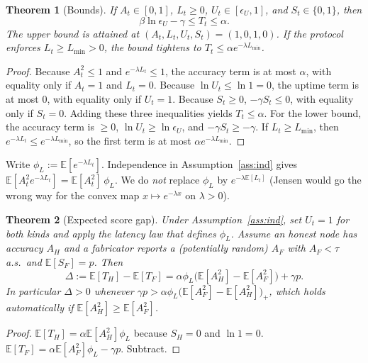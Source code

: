 \documentclass[conference]{IEEEtran}
\newtheorem{theorem}{Theorem}
\begin{document}
\begin{theorem}[Bounds]
\label{thm:bounds}
If $A_t\in[0,1]$, $L_t\ge 0$, $U_t\in[\epsilon_U,1]$, and $S_t\in\{0,1\}$, then
\[
  \beta\ln\epsilon_U-\gamma \le T_t \le \alpha.
\]
The upper bound is attained at $(A_t,L_t,U_t,S_t)=(1,0,1,0)$. If the protocol enforces $L_t\ge L_{\min}>0$, the bound tightens to $T_t\le\alpha e^{-\lambda L_{\min}}$.
\end{theorem}

\begin{proof}
Because $A_t^2\le 1$ and $e^{-\lambda L_t}\le 1$, the accuracy term is at most $\alpha$, with equality only if $A_t=1$ and $L_t=0$. Because $\ln U_t\le\ln 1=0$, the uptime term is at most $0$, with equality only if $U_t=1$. Because $S_t\ge 0$, $-\gamma S_t\le 0$, with equality only if $S_t=0$. Adding these three inequalities yields $T_t\le\alpha$. For the lower bound, the accuracy term is $\ge 0$, $\ln U_t\ge\ln\epsilon_U$, and $-\gamma S_t\ge-\gamma$. If $L_t\ge L_{\min}$, then $e^{-\lambda L_t}\le e^{-\lambda L_{\min}}$, so the first term is at most $\alpha e^{-\lambda L_{\min}}$.
\end{proof}

Write $\phi_L:=\mathbb{E}[e^{-\lambda L_t}]$. Independence in Assumption~\ref{ass:ind} gives $\mathbb{E}[A_t^2 e^{-\lambda L_t}]=\mathbb{E}[A_t^2]\,\phi_L$. We do \emph{not} replace $\phi_L$ by $e^{-\lambda\mathbb{E}[L_t]}$ (Jensen would go the wrong way for the convex map $x\mapsto e^{-\lambda x}$ on $\lambda>0$).

\begin{theorem}[Expected score gap]
\label{thm:score gap}
Under Assumption~\ref{ass:ind}, set $U_t=1$ for both kinds and apply the latency law that defines $\phi_L$. Assume an honest node has accuracy $A_H$ and a fabricator reports a (potentially random) $A_F$ with $A_F<\tau$ a.s.\ and $\mathbb{E}[S_F]=p$. Then
\begin{equation}
  \Delta := \mathbb{E}[T_H]-\mathbb{E}[T_F]
  = \alpha\phi_L\bigl(\mathbb{E}[A_H^2]-\mathbb{E}[A_F^2]\bigr)+\gamma p.
  \label{eq:gap}
\end{equation}
In particular $\Delta>0$ whenever $\gamma p>\alpha\phi_L\bigl(\mathbb{E}[A_F^2]-\mathbb{E}[A_H^2]\bigr)_+$, which holds automatically if $\mathbb{E}[A_H^2]\ge\mathbb{E}[A_F^2]$.
\end{theorem}

\begin{proof}
$\mathbb{E}[T_H]=\alpha\mathbb{E}[A_H^2]\phi_L$ because $S_H=0$ and $\ln 1=0$. $\mathbb{E}[T_F]=\alpha\mathbb{E}[A_F^2]\phi_L-\gamma p$. Subtract.
\end{proof}
\end{document}
